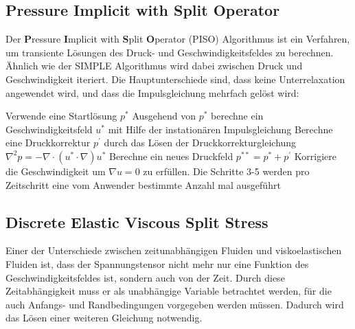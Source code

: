 \subsection{Pressure Implicit with Split Operator}
Der \textbf{P}ressure \textbf{I}mplicit with \textbf{S}plit \textbf{O}perator (PISO) \cite{cfd} Algorithmus ist ein Verfahren, um transiente Lösungen des Druck- und Geschwindigkeitsfeldes zu berechnen.\\
Ähnlich wie der \mbox{SIMPLE} Algorithmus wird dabei zwischen Druck und Ge\-schwin\-dig\-keit iteriert. Die Hauptunterschiede sind, dass keine Unterrelaxation angewendet wird, und dass die Impulsgleichung mehrfach gelöst wird:
\begin{outline}[enumerate]
    \1 Verwende eine Startlösung $p^*$
    \1 Ausgehend von $p^*$ berechne ein Geschwindigkeitsfeld $u^*$ mit Hilfe der instationären Impulsgleichung
    \1 Berechne eine Druckkorrektur $p^{'}$ durch das Lösen der Druckkorrekturgleichung $\nabla^2p=-\nabla \cdot \left( u^*\cdot\nabla \right)u^*$
    \1 Berechne ein neues Druckfeld $p^{**}=p^*+ p^{'}$
    \1 Korrigiere die Geschwindigkeit um $\nabla u=0$ zu erfüllen.
    \1 Die Schritte 3-5 werden pro Zeitschritt eine vom Anwender bestimmte Anzahl mal ausgeführt
\end{outline}

\subsection{Discrete Elastic Viscous Split Stress}
Einer der Unterschiede zwischen zeitunabhängigen Fluiden und viskoelastischen Fluiden ist, dass der Spannungstensor nicht mehr nur eine Funktion des Geschwindigkeitsfeldes ist, sondern auch von der Zeit. Durch diese Zeitabhängigkeit muss er als unabhängige Variable betrachtet werden, für die auch Anfangs- und Randbedingungen vorgegeben werden müssen. Da\-durch wird das Lösen einer weiteren Gleichung notwendig.

